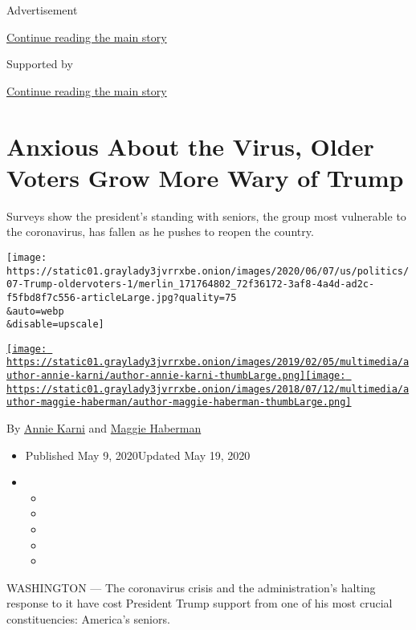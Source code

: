 Advertisement

\protect\hyperlink{after-top}{Continue reading the main story}

Supported by

\protect\hyperlink{after-sponsor}{Continue reading the main story}

\hypertarget{anxious-about-the-virus-older-voters-grow-more-wary-of-trump}{%
\section{Anxious About the Virus, Older Voters Grow More Wary of
Trump}\label{anxious-about-the-virus-older-voters-grow-more-wary-of-trump}}

Surveys show the president's standing with seniors, the group most
vulnerable to the coronavirus, has fallen as he pushes to reopen the
country.

\texttt{[image: https://static01.graylady3jvrrxbe.onion/images/2020/06/07/us/politics/07-Trump-oldervoters-1/merlin\_171764802\_72f36172-3af8-4a4d-ad2c-f5fbd8f7c556-articleLarge.jpg?quality=75\\\&auto=webp\\\&disable=upscale]}

\href{https://www.nytimes3xbfgragh.onion/by/annie-karni}{\texttt{[image: https://static01.graylady3jvrrxbe.onion/images/2019/02/05/multimedia/author-annie-karni/author-annie-karni-thumbLarge.png]}}\href{https://www.nytimes3xbfgragh.onion/by/maggie-haberman}{\texttt{[image: https://static01.graylady3jvrrxbe.onion/images/2018/07/12/multimedia/author-maggie-haberman/author-maggie-haberman-thumbLarge.png]}}

By \href{https://www.nytimes3xbfgragh.onion/by/annie-karni}{Annie Karni}
and \href{https://www.nytimes3xbfgragh.onion/by/maggie-haberman}{Maggie
Haberman}

\begin{itemize}
\item
  Published May 9, 2020Updated May 19, 2020
\item
  \begin{itemize}
  \item
  \item
  \item
  \item
  \item
  \end{itemize}
\end{itemize}

WASHINGTON --- The coronavirus crisis and the administration's halting
response to it have cost President Trump support from one of his most
crucial constituencies: America's seniors.

